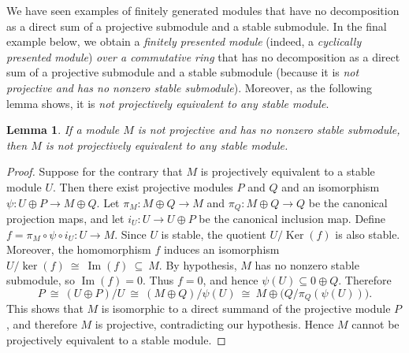 \documentclass[11pt,a4paper]{amsart}
\theoremstyle{plain}
\newtheorem{lemma}[theorem]{Lemma}
\theoremstyle{definition}
\theoremstyle{remark}
\newcommand{\Ker}{\operatorname{Ker}}
\begin{document}
We have seen examples of finitely generated modules that have no decomposition as a direct sum of a projective submodule and a stable submodule. In the final example below, we obtain a \emph{finitely presented module} (indeed, a \emph{cyclically presented module}) \emph{over a commutative ring} that has no decomposition as a direct sum of a projective submodule and a stable submodule {(because it is \emph{not projective and has no nonzero stable submodule}). Moreover, {as the following lemma  shows}, it is \emph{not projectively equivalent to any stable module}.}
{
\begin{lemma}\label{lem:proj-equiv-stable}
If  a module $M$ is not projective and has no nonzero stable submodule, then $M$ is not projectively equivalent to any stable module.
\end{lemma}
\begin{proof} Suppose for the contrary that $M$ is projectively equivalent to a stable module $U$. Then there exist projective modules $P$ and $Q$ and an isomorphism $\psi : U \oplus P \longrightarrow M \oplus Q$.
Let $\pi_M : M \oplus Q \to M$ and $\pi_Q : M \oplus Q \to Q$ be the canonical projection maps, and let $i_U : U \to U \oplus P$ be the canonical inclusion map. Define
$f = \pi_M \circ \psi \circ i_U : U \longrightarrow M$.
Since $U$ is stable, the quotient $U / \Ker(f)$ is also stable. Moreover, the homomorphism $f$ induces an isomorphism
$U / \ker(f) \ \cong \ \operatorname{Im}(f) \ \subseteq \ M$.
By hypothesis, $M$ has no nonzero stable submodule, so $\operatorname{Im}(f) = 0$. Thus $f = 0$, and hence $\psi(U) \subseteq 0 \oplus Q$. Therefore
\[P \ \cong \ (U \oplus P)/U \ \cong \ (M \oplus Q) / \psi(U) \ \cong \ M \oplus \big(Q / \pi_Q(\psi(U))\big).\]
This shows that $M$ is isomorphic to a direct summand of the projective module $P$, and therefore $M$ is projective, contradicting our hypothesis. Hence $M$ cannot be projectively equivalent to a stable module.
\end{proof}}
\end{document}
